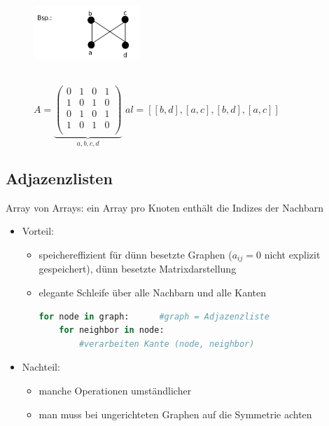 \documentclass[11pt, fleqn]{scrreprt}
\begin{document}
	\begin{figure}[htbp]
		\begin{minipage}[t]{4cm}
			\vspace{0cm}
			\includegraphics[width=4cm,height=3cm,keepaspectratio]{./Pictures/Adjazenzmatrix.png}
		\end{minipage}
		\begin{minipage}[t]{12cm}
			\vspace{0.0cm}
			$A = \underbrace{\begin{pmatrix}
			0 & 1 & 0 & 1 \\
			1 & 0 & 1 & 0 \\
			0 & 1 & 0 & 1 \\
			1 & 0 & 1 & 0 \\
			\end{pmatrix} }_{a, b, c, d}$ \hspace*{1cm} $al = [[b, d], [a, c], [b, d], [a,c]]$
		\end{minipage}
	\end{figure}
	
	\subsection*{Adjazenzlisten}
	Array von Arrays: ein Array pro Knoten enthält die Indizes der Nachbarn
	\begin{itemize}
		\item Vorteil:
		\begin{itemize}
			\item speichereffizient für dünn besetzte Graphen ($a_{ij} = 0$ nicht explizit gespeichert), \glqq dünn besetzte Matrixdarstellung\grqq
			\item elegante Schleife über alle Nachbarn und alle Kanten
			\begin{lstlisting}[language=Python]
for node in graph:		#graph = Adjazenzliste
	for neighbor in node:
		#verarbeiten Kante (node, neighbor)
			\end{lstlisting}
		\end{itemize}
		\item Nachteil:
		\begin{itemize}
			\item manche Operationen umständlicher
			\item man muss bei ungerichteten Graphen auf die Symmetrie achten
		\end{itemize}
	\end{itemize}
\end{document}
